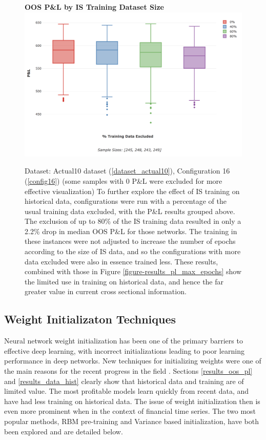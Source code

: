 \documentclass[a4paper,11pt,oneside]{article}
\theoremstyle{plain}
\theoremstyle{definition}
\begin{document}
	
	\begin{figure}[H]
		\centering 
		\textbf{OOS P\&L by IS Training Dataset Size}
		\includegraphics[scale=0.4]{images/results/data/training_data_excluded.png}
		\caption[OOS P\&L by IS Training Dataset Size]{
			Dataset: Actual10 dataset (\ref{dataset_actual10}), Configuration 16 (\ref{config16}) (some samples with 0 P\&L were excluded for more effective visualization)
			\newline To further explore the effect of IS training on historical data, configurations were run with a percentage of the usual training data excluded, with the P\&L results grouped above. The exclusion of up to 80\% of the IS training data resulted in only a 2.2\% drop in median OOS P\&L for those networks. The training in these instances were not adjusted to increase the number of epochs according to the size of IS data, and so the configurations with more data excluded were also in essence trained less. These results, combined with those in Figure \ref{figure-results_pl_max_epochs} show the limited use in training on historical data, and hence the far greater value in current cross sectional information.}
		\label{figure-results_it3_validationset}
	\end{figure}
	
	
	\newpage
	
	\subsection{Weight Initializaton Techniques}\label{results_init}
	
	Neural network weight initialization has been one of the primary barriers to effective deep learning, with incorrect initializations leading to poor learning performance in deep networks. New techniques for initializing weights were one of the main reasons for the recent progress in the field \citep{Hinton2}. Sections \ref{results_oos_pl} and \ref{results_data_hist} clearly show that historical data and training are of limited value. The most profitable models learn quickly from recent data, and have had less training on historical data. The issue of weight initialization then is even more prominent when in the context of financial time series. The two most popular methods, RBM pre-training and Variance based initialization, have both been explored and are detailed below.
	
\end{document}
